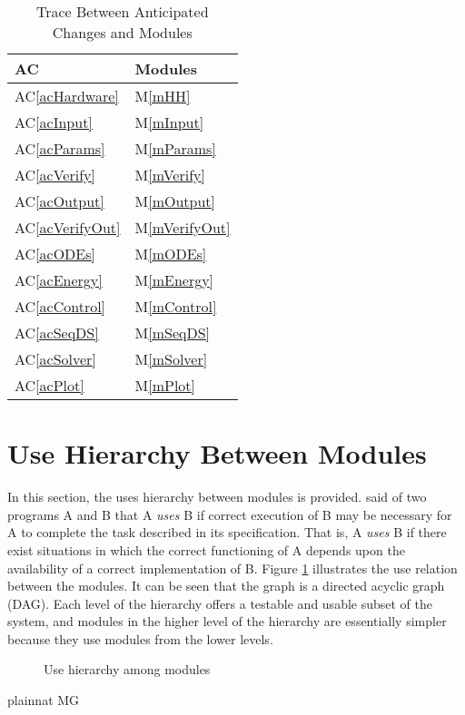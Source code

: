 \documentclass[12pt, titlepage]{article}
\newcommand{\acref}[1]{AC\ref{#1}}
\newcommand{\mref}[1]{M\ref{#1}}
\begin{document}
\begin{table}[H]
\centering
\begin{tabular}{p{} p{}}
\toprule
\textbf{AC} & \textbf{Modules}\\
\midrule
\acref{acHardware} & \mref{mHH}\\
\acref{acInput} & \mref{mInput}\\
\acref{acParams} & \mref{mParams}\\
\acref{acVerify} & \mref{mVerify}\\
\acref{acOutput} & \mref{mOutput}\\
\acref{acVerifyOut} & \mref{mVerifyOut}\\
\acref{acODEs} & \mref{mODEs}\\
\acref{acEnergy} & \mref{mEnergy}\\
\acref{acControl} & \mref{mControl}\\
\acref{acSeqDS} & \mref{mSeqDS}\\
\acref{acSolver} & \mref{mSolver}\\
\acref{acPlot} & \mref{mPlot}\\
\bottomrule
\end{tabular}
\caption{Trace Between Anticipated Changes and Modules}
\label{TblACT}
\end{table}

\section{Use Hierarchy Between Modules} \label{SecUse}

In this section, the uses hierarchy between modules is
provided. \citet{Parnas1978} said of two programs A and B that A {\em uses} B if
correct execution of B may be necessary for A to complete the task described in
its specification. That is, A {\em uses} B if there exist situations in which
the correct functioning of A depends upon the availability of a correct
implementation of B.  Figure \ref{FigUH} illustrates the use relation between
the modules. It can be seen that the graph is a directed acyclic graph
(DAG). Each level of the hierarchy offers a testable and usable subset of the
system, and modules in the higher level of the hierarchy are essentially simpler
because they use modules from the lower levels.

\begin{figure}[H]
\centering
\caption{Use hierarchy among modules}
\label{FigUH}
\end{figure}


 {plainnat}
 {MG}
\end{document}
